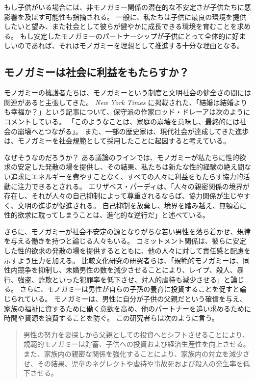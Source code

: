 \documentclass[paper=a4,book,openany]{jlreq} \usepackage{mystyle}
\begin{document}
もし子供がいる場合には、非モノガミー関係の潜在的な不安定さが子供たちに悪影響を及ぼす可能性も指摘される。
一般に、私たちは子供に最良の環境を提供したいと望み、また社会として彼らが健やかに成長できる環境を育むことを求める。
もし安定したモノガミーのパートナーシップが子供にとって全体的に好ましいのであれば、それはモノガミーを理想として推進する十分な理由となる。

\subsection{モノガミーは社会に利益をもたらすか？}

モノガミーの擁護者たちは、モノガミーという制度と文明社会の健全さの間には関連があると主張してきた。
\emph{New York Times} に掲載された、「結婚は結婚よりも幸福か？」という記事について、保守派の作家ロッド・ドレーアは次のようにコメントしている。
「このようなことは、家庭の崩壊を意味し、最終的には社会の崩壊へとつながる」\citep{dreher17:_perver_progr}。
また、一部の歴史家は、現代社会が達成してきた進歩は、モノガミーを社会規範として採用したことに起因すると考えている。

なぜそうなのだろうか？ ある議論のラインでは、モノガミーが私たちに性的欲求の安定した発散の場を提供し、その結果、私たちは新たな性的経験の絶え間ない追求にエネルギーを費やすことなく、すべての人々に利益をもたらす協力的活動に注力できるとされる。
エリザベス・パーディは、「人々の親密関係の境界が存在し、それが人々の自己抑制によって尊重されるならば、協力関係が生じやすく、文明の進歩が促進される。
自己抑制を放棄し、境界を踏み越え、無頓着に性的欲求に耽ってしまうことは、進化的な逆行だ」と述べている\citep{pardi19:_no_human_being_arent_happier}。

さらに、モノガミーが社会不安定の源となりがちな若い男性を落ち着かせ、規律を与える働きを持つと論じる人々もいる。
コミットメント関係は、彼らに安定した性的欲求の発散の場を提供するとともに、他の人々に対して責任感と配慮を示すよう圧力を加える。
比較文化研究の研究者らは、「規範的モノガミーは、同性内競争を抑制し、未婚男性の数を減少させることにより、レイプ、殺人、暴行、強盗、詐欺といった犯罪率を低下させ、対人的虐待も減少させる」と論じる\citep[p.657]{henrich12:_puzzl_monog_marriag}。
さらに、モノガミーは男性が自らの子孫の養育に投資することを促すと論じられている。
モノガミーは、男性に自分が子供の父親だという確信を与え、家族の福祉に資するために働く意欲を高め、他のパートナーを追い求めるために時間や資源を浪費することを防ぐ。
この研究者らは次のように言う。

\begin{quote}
男性の努力を妻探しから父親としての投資へとシフトさせることにより、規範的モノガミーは貯蓄、子供への投資および経済生産性を向上させる。
また、家族内の親密な関係を強化することにより、家族内の対立を減少させ、その結果、児童のネグレクトや虐待や事故死および殺人の発生率を低下させる。
\citep[p.657]{henrich12:_puzzl_monog_marriag}
\end{quote}
\end{document}
